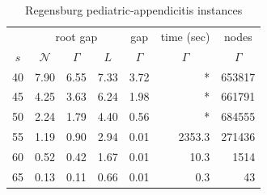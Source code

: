 \documentclass[smallextended]{svjour3hack}       %
\begin{document}
\begin{table}[!ht]
\centering
\scriptsize
\begin{tabular}{l|rrr|r|r|r}
                                     & \multicolumn{3}{c|}{\scriptsize root gap}                                                   & \multicolumn{1}{c|}{\scriptsize gap} & \multicolumn{1}{c|}{\scriptsize time (sec)} & \multicolumn{1}{c}{\raisebox{1.2pt}{{\scriptsize{$\#$}}}\! nodes}   \\
\multicolumn{1}{c|}{\scriptsize $s$} & \multicolumn{1}{c}{$\mathcal{N}$} & \multicolumn{1}{c}{$\Gamma$} & \multicolumn{1}{c|}{$L$} & \multicolumn{1}{c|}{$\Gamma$}        & \multicolumn{1}{c|}{$\Gamma$}               & \multicolumn{1}{c}{$\Gamma$}                                                                        \\ \hline
40                                   & 7.90                              & 6.55                         & 7.33                     & 3.72                                 & *                                           & 653817                                                                                                                           \\
45                                   & 4.25                              & 3.63                         & 6.24                     & 1.98                                 & *                                           & 661791                                                                                                                           \\
50                                   & 2.24                              & 1.79                         & 4.40                     & 0.56                                 & *                                           & 684555                                                                                                                           \\
55                                   & 1.19                              & 0.90                         & 2.94                     & 0.01                                 & 2353.3                                      & 271436                                                                                                                            \\
60                                   & 0.52                              & 0.42                         & 1.67                     & 0.01                                 & 10.3                                        & 1514                                                                                                                              \\
65                                   & 0.13                              & 0.11                         & 0.66                     & 0.01                                 & 0.3                                         & 43                                                                                                                               
\end{tabular}
\caption{Regensburg pediatric-appendicitis instances}
\label{tab:appendicitis} 
\end{table}
\end{document}
